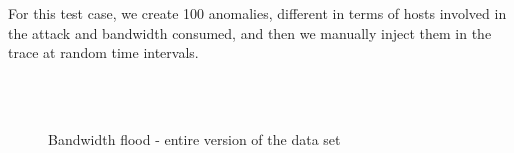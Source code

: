 \documentclass[12pt,a4paper,cucitura]{toptesi}
\begin{document}
For this test case, we create 100 anomalies, different in terms of hosts involved in the attack and bandwidth consumed, and then we manually inject them in the trace at random time intervals.

\begin{figure}
\centering
{}
\\
\\
\caption[Bandwidth flood - entire data set]{Bandwidth flood - entire version of the data set}
\end{figure}
\end{document}
